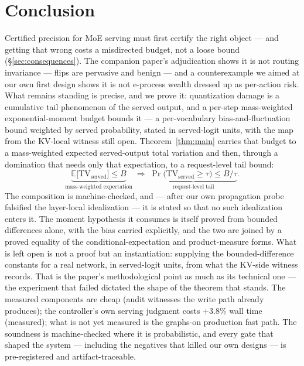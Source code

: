 \documentclass[11pt]{article}
\renewcommand{\_}{\WCorigunderscore\allowbreak}
\begin{document}
\section{Conclusion}
Certified precision for MoE serving must first certify the right
object --- and getting that wrong costs a misdirected budget, not a loose
bound (\S\ref{sec:consequences}). The companion paper's adjudication
shows it is not routing invariance ---
flips are pervasive and benign --- and a counterexample we aimed at
our own first design shows it is not e-process wealth dressed up as
per-action risk. What remains standing is precise, and we prove it:
quantization damage is a cumulative tail phenomenon of the served
output, and a per-step mass-weighted exponential-moment
budget bounds it --- a per-vocabulary bias-and-fluctuation bound weighted
by served probability, stated in served-logit units, with the map from
the KV-local witness still open. Theorem~\ref{thm:main} carries
that budget to a mass-weighted expected served-output total variation
and then, through a domination that needs only that expectation, to a
request-level tail bound:
\begin{equation}
\underbrace{\mathbb{E}\bigl[\mathrm{TV}_{\text{served}}\bigr]\le B}
      _{\text{mass-weighted expectation}}
\;\Longrightarrow\;
\underbrace{\Pr\bigl(\mathrm{TV}_{\text{served}}\ge\tau\bigr)\le B/\tau}
      _{\text{request-level tail}} .
\label{eq:twolevel}
\end{equation}
The composition is machine-checked, and ---
after our own propagation probe falsified the layer-local idealization
--- it is stated so that no such idealization enters it. The moment
hypothesis it consumes is itself proved from bounded differences alone,
with the bias carried explicitly, and the two are joined by a proved
equality of the conditional-expectation and product-measure forms. What
is left open is not a proof but an instantiation: supplying the
bounded-difference constants for a real network, in served-logit units,
from what the KV-side witness records. That is
the paper's methodological point as much as its technical one --- the
experiment that failed dictated the shape of the theorem that stands. The measured components are cheap (audit witnesses the write path
already produces); the controller's own serving
judgment costs $+3.8\%$ wall time (measured); what is not yet measured is
the graphs-on production fast path. The soundness is
machine-checked where it is probabilistic, and every gate that shaped
the system --- including the negatives that killed our own designs ---
is pre-registered and artifact-traceable.
\end{document}
